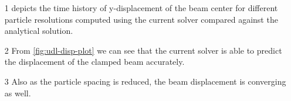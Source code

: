 \documentclass[10pt, conference]{FMFP2022}
\begin{document}
\begin{itemize}
\item [1]  depicts the time history of y-displacement of
  the beam center for different particle resolutions computed using the current
  solver compared against the analytical solution.
\item [2] From \cref{fig:udl-disp-plot} we can see that the current solver is
  able to predict the displacement of the clamped beam accurately.
\item [3] Also as the particle spacing is reduced, the beam displacement
  is converging as well.
\end{itemize}
\begin{figure}[H]
    \centering
\end{figure}
\end{document}
